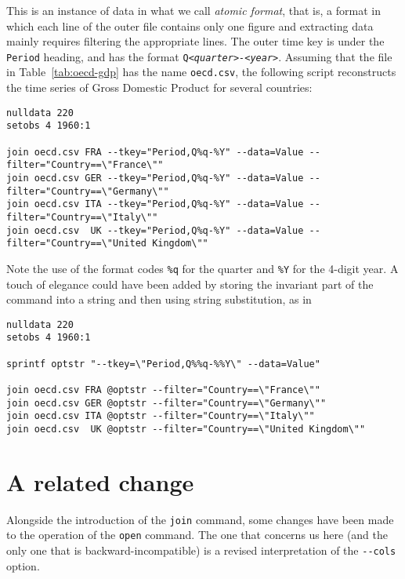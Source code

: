 This is an instance of data in what we call \emph{atomic format}, that
is, a format in which each line of the outer file contains only one
figure and extracting data mainly requires filtering the appropriate
lines. The outer time key is under the \texttt{Period} heading, and
has the format \texttt{Q\emph{<quarter>-<year>}}. Assuming that the
file in Table~\ref{tab:oecd-gdp} has the name \texttt{oecd.csv}, the
following script reconstructs the time series of Gross Domestic
Product for several countries:

\begin{footnotesize}
\begin{verbatim}
nulldata 220
setobs 4 1960:1

join oecd.csv FRA --tkey="Period,Q%q-%Y" --data=Value --filter="Country==\"France\""
join oecd.csv GER --tkey="Period,Q%q-%Y" --data=Value --filter="Country==\"Germany\""
join oecd.csv ITA --tkey="Period,Q%q-%Y" --data=Value --filter="Country==\"Italy\""
join oecd.csv  UK --tkey="Period,Q%q-%Y" --data=Value --filter="Country==\"United Kingdom\""
\end{verbatim}
\end{footnotesize}

Note the use of the format codes \verb|%q| for the quarter and
\verb|%Y| for the 4-digit year. A touch of elegance could
have been added by storing the invariant part of the 
command into a string and then using string substitution, as in

\begin{footnotesize}
\begin{verbatim}
nulldata 220
setobs 4 1960:1

sprintf optstr "--tkey=\"Period,Q%%q-%%Y\" --data=Value"

join oecd.csv FRA @optstr --filter="Country==\"France\""
join oecd.csv GER @optstr --filter="Country==\"Germany\""
join oecd.csv ITA @optstr --filter="Country==\"Italy\""
join oecd.csv  UK @optstr --filter="Country==\"United Kingdom\""
\end{verbatim}
\end{footnotesize}


\section{A related change}
\label{sec:join-cols}

Alongside the introduction of the \texttt{join} command, some changes
have been made to the operation of the \texttt{open} command. The one
that concerns us here (and the only one that is backward-incompatible)
is a revised interpretation of the \verb|--cols| option. 

